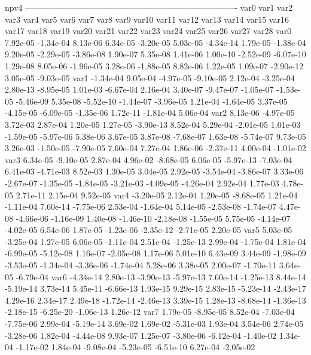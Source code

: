 npv4
----------------------------------------------------------------------------
var0 var1 var2 var3 var4 var5 var6 var7 var8 var9 var10 var11 var12 var13 var14 var15 var16 var17 var18 var19 var20 var21 var22 var23 var24 var25 var26 var27 var28 
var0  7.92e-05 -1.34e-04  8.13e-06  6.34e-05 -3.20e-05  5.03e-05 -4.34e-14  1.79e-05 -1.38e-04  9.20e-05 -2.29e-05 -3.86e-08  1.90e-07  5.35e-08  1.41e-06  1.00e-10 -2.52e-09 -6.07e-10  1.29e-08  8.05e-06 -1.96e-05  3.28e-06 -1.88e-05  8.82e-06  1.22e-05  1.09e-07 -2.90e-12  3.05e-05 -9.03e-05
var1 -1.34e-04  9.05e-04 -4.97e-05 -9.10e-05  2.12e-04 -3.25e-04  2.80e-13 -8.95e-05  1.01e-03 -6.67e-04  2.16e-04  3.40e-07 -9.47e-07 -1.05e-07 -1.53e-05 -5.46e-09  5.35e-08 -5.52e-10 -1.44e-07 -3.96e-05  1.21e-04 -1.64e-05  3.37e-05 -4.15e-05 -6.09e-05 -1.35e-06  1.72e-11 -1.81e-04  5.06e-04
var2  8.13e-06 -4.97e-05  3.72e-03  2.87e-04  1.20e-05  1.27e-05 -3.90e-13  8.52e-04  5.29e-04 -2.01e-05  1.01e-03 -1.59e-05 -5.97e-06  5.38e-06  3.67e-05  3.87e-08 -7.68e-07  1.63e-08 -5.74e-07  9.73e-05  3.26e-03 -1.50e-05 -7.90e-05  7.60e-04  7.27e-04  1.86e-06 -2.37e-11  4.00e-04 -1.01e-02
var3  6.34e-05 -9.10e-05  2.87e-04  4.96e-02 -8.68e-05  6.06e-05 -5.97e-13 -7.03e-04  6.41e-03 -4.71e-03  8.52e-03  1.30e-05  3.04e-05  2.92e-05 -3.54e-04 -3.86e-07  3.33e-06 -2.67e-07 -1.35e-05 -1.84e-05 -3.21e-03 -4.09e-05 -4.26e-04  2.92e-04  1.77e-03  4.78e-05  2.71e-11  2.15e-04  9.52e-05
var4 -3.20e-05  2.12e-04  1.20e-05 -8.68e-05  1.21e-04 -1.11e-04  7.60e-14 -7.75e-06  2.53e-04 -1.64e-04  5.14e-05 -2.53e-08 -1.74e-07  4.47e-08 -4.66e-06 -1.16e-09  1.40e-08 -1.46e-10 -2.18e-08 -1.55e-05  5.75e-05 -4.14e-07 -4.02e-05  6.54e-06  1.87e-05 -1.23e-06 -2.35e-12 -2.71e-05  2.20e-05
var5  5.03e-05 -3.25e-04  1.27e-05  6.06e-05 -1.11e-04  2.51e-04 -1.25e-13  2.99e-04 -1.75e-04  1.81e-04 -6.99e-05 -5.12e-08  1.16e-07 -2.05e-08  1.17e-06  5.01e-10  6.43e-09  3.44e-09 -1.98e-09 -3.53e-05 -1.34e-04 -3.36e-06 -1.74e-04  5.28e-06  3.38e-05  2.00e-07 -1.70e-11  3.64e-05 -6.79e-04
var6 -4.34e-14  2.80e-13 -3.90e-13 -5.97e-13  7.60e-14 -1.25e-13  8.44e-14 -5.19e-14  3.73e-14  5.45e-11 -6.66e-13  1.93e-15  9.29e-15  2.83e-15 -5.23e-14 -2.43e-17  4.29e-16  2.34e-17  2.49e-18 -1.72e-14 -2.46e-13  3.39e-15  1.28e-13 -8.68e-14 -1.36e-13 -2.18e-15 -6.25e-20 -1.06e-13  1.26e-12
var7  1.79e-05 -8.95e-05  8.52e-04 -7.03e-04 -7.75e-06  2.99e-04 -5.19e-14  3.69e-02  1.69e-02 -5.31e-03  1.93e-04  3.54e-06  2.74e-05 -3.28e-06  1.82e-04 -4.44e-08  9.93e-07  1.25e-07 -3.80e-06 -6.12e-04 -1.40e-02  1.34e-04 -1.17e-02  1.84e-04 -9.08e-04 -5.23e-05 -6.51e-10  6.27e-04 -2.05e-02
